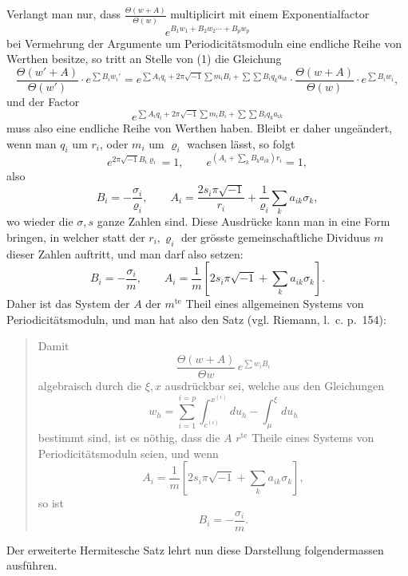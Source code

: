 \documentclass[10pt]{article}
\begin{document}
Verlangt man nur, dass \(\frac{\Theta(w+A)}{\Theta(w)}\) multiplicirt mit einem Exponentialfactor
\[
e^{B_1w_1+B_2w_2\cdots+B_pw_p}
\]
bei Vermehrung der Argumente um Periodicitätsmoduln eine endliche Reihe von Werthen besitze, so tritt an Stelle von (1) die Gleichung
\[
\frac{\Theta(w'+A)}{\Theta(w')}\cdot e^{\sum B_iw_i'}=
e^{\sum A_iq_i+2\pi\sqrt{-1}\sum m_iB_i+\sum\sum B_iq_ka_{ik}}
\cdot
\frac{\Theta(w+A)}{\Theta(w)}\cdot e^{\sum B_iw_i},
\]
und der Factor
\[
e^{\sum A_iq_i+2\pi\sqrt{-1}\sum m_iB_i+\sum\sum B_iq_ka_{ik}}
\]
muss also eine endliche Reihe von Werthen haben. Bleibt er daher ungeändert, wenn man \(q_i\) um \(r_i\), oder \(m_i\) um \(\varrho_i\) wachsen lässt, so folgt
\[
e^{2\pi\sqrt{-1}B_i\varrho_i}=1,\qquad
e^{(A_i+\sum_kB_ka_{ik})r_i}=1,
\]
also
\[
B_i=-\frac{\sigma_i}{\varrho_i},\qquad
A_i=\frac{2s_i\pi\sqrt{-1}}{r_i}+\frac{1}{\varrho_i}\sum_k a_{ik}\sigma_k,
\]
wo wieder die \(\sigma,s\) ganze Zahlen sind. Diese Ausdrücke kann man in eine Form bringen, in welcher statt der \(r_i,\varrho_i\) der grösste gemeinschaftliche Dividuus \(m\) dieser Zahlen auftritt, und man darf also setzen:
\[
B_i=-\frac{\sigma_i}{m},\qquad
A_i=\frac1m\left[2s_i\pi\sqrt{-1}+\sum_k a_{ik}\sigma_k\right].
\]
Daher ist das System der \(A\) der \(m^{\text{te}}\) Theil eines allgemeinen Systems von Periodicitätsmoduln, und man hat also den Satz (vgl. Riemann, l.~c. p.~154):

\begin{quote}
Damit
\[
\frac{\Theta(w+A)}{\Theta w}\,e^{\sum w_iB_i}
\]
algebraisch durch die \(\xi,x\) ausdrückbar sei, welche aus den Gleichungen
\[
w_h=\sum_{i=1}^{i=p}\int_{c^{(i)}}^{x^{(i)}}du_h-\int_{\mu}^{\xi}du_h
\]
bestimmt sind, ist es nöthig, dass die \(A\) \(r^{\text{te}}\) Theile eines Systems von Periodicitätsmoduln seien, und wenn
\[
A_i=\frac1m\left[2s_i\pi\sqrt{-1}+\sum_k a_{ik}\sigma_k\right],
\]
so ist
\[
B_i=-\frac{\sigma_i}{m}.
\]
\end{quote}

Der erweiterte Hermitesche Satz lehrt nun diese Darstellung folgendermassen ausführen.
\end{document}
